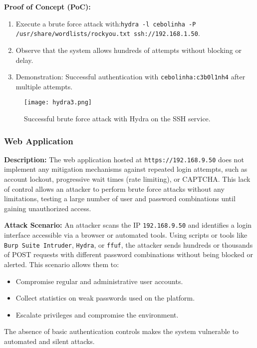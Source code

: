 \documentclass[a4paper,12pt]{article}
\begin{document}
\textbf{Proof of Concept (PoC):}  
\begin{enumerate}
    \item Execute a brute force attack with:\newline \texttt{hydra -l cebolinha -P /usr/share/wordlists/rockyou.txt ssh://192.168.1.50}.  
    \item Observe that the system allows hundreds of attempts without blocking or delay.  
    \item Demonstration: Successful authentication with \texttt{cebolinha:c3b0l1nh4} after multiple attempts.  
\end{enumerate}

\clearpage

\begin{figure}[ht]
    \centering
    \texttt{[image: hydra3.png]}
    \caption{Successful brute force attack with Hydra on the SSH service.}
\end{figure}

\clearpage

\subsubsection{Web Application}
\textbf{Description:}  
The web application hosted at \texttt{https://192.168.9.50} does not implement any mitigation mechanisms against repeated login attempts, such as account lockout, progressive wait times (rate limiting), or CAPTCHA. This lack of control allows an attacker to perform brute force attacks without any limitations, testing a large number of user and password combinations until gaining unauthorized access.

\textbf{Attack Scenario:}  
An attacker scans the IP \texttt{192.168.9.50} and identifies a login interface accessible via a browser or automated tools. Using scripts or tools like \texttt{Burp Suite Intruder}, \texttt{Hydra}, or \texttt{ffuf}, the attacker sends hundreds or thousands of POST requests with different password combinations without being blocked or alerted. This scenario allows them to:  
\begin{itemize}
    \item Compromise regular and administrative user accounts.  
    \item Collect statistics on weak passwords used on the platform.  
    \item Escalate privileges and compromise the environment.  
\end{itemize}
The absence of basic authentication controls makes the system vulnerable to automated and silent attacks.
\end{document}
